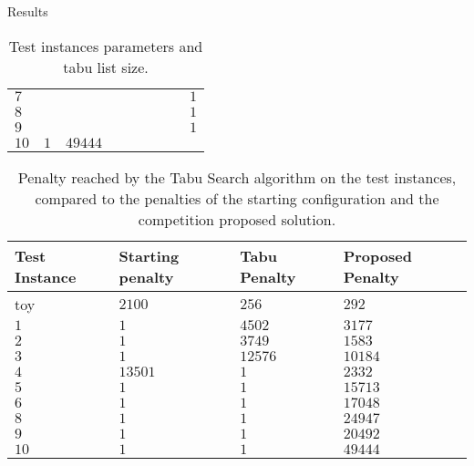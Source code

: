 \begin{section}{Results}
\begin{table}[]
\begin{tabular}{lllllllll}
    $7$                    &               &                 &                    &                   &                             &                &                 & $1$                     \\
    $8$                    &               &                 &                    &                   &                             &                &                 & $1$                     \\
    $9$                    &               &                 &                    &                   &                             &                &                 & $1$                     \\
    $10$                   & $1$           & $49444$         &                    &                   &                             &                &                 &                        
    \end{tabular}
    \caption{Test instances parameters and tabu list size.}
    \label{tab:parameters}
    \end{table}
 \begin{table}[]
     \begin{tabular}{llll}
         \hline
         \textbf{Test Instance} & \textbf{Starting penalty} & \textbf{Tabu Penalty} & \textbf{Proposed Penalty} \\ \hline
         toy                    & $2100$                    & $256$                 & $292$                     \\
         $1$                    & $1$                       & $4502$                & $3177$                    \\
         $2$                    & $1$                       & $3749$                & $1583$                    \\
         $3$                    & $1$                       & $12576$               & $10184$                   \\
         $4$                    & $13501$                  & $1$                   & $2332$                    \\
         $5$                    & $1$                       & $1$                   & $15713$                   \\
         $6$                    & $1$                       & $1$                   & $17048$                   \\
         $8$                    & $1$                       & $1$                   & $24947$                   \\
         $9$                    & $1$                       & $1$                   & $20492$                   \\
         $10$                   & $1$                       & $1$                   & $49444$
     \end{tabular}
     \caption{Penalty reached by the Tabu Search algorithm on the test instances, compared to the
         penalties of the starting configuration and the competition proposed solution.}
     \label{tab:penalties}
 \end{table}

\end{section}